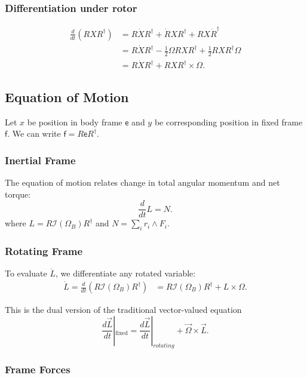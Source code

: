 \subsubsection{Differentiation under rotor}
\begin{align*}
	\frac{d}{dt }(RXR^\dag)
	&= R\dot X R^\dag + \dot R XR^\dag + RX \dot R^\dag \\
	&= R\dot X R^\dag - \frac{1}{2} \Omega R X R^\dag + \frac{1}{2} R X R^\dag \Omega \\
	&= R\dot X R^\dag + RXR^\dag \times \Omega
.\end{align*}



\subsection{Equation of Motion}

Let $x$ be position in body frame $\mathsf{e}$ and $y$ be corresponding position in fixed frame $\mathsf{f}$. We can write $\mathsf{f} = R \mathsf{e} R^{\dag} $.

\subsubsection{Inertial Frame}

The equation of motion relates change in total angular momentum and net torque:
\[
	\frac{d}{dt } L = N
.\] 
where $L = R \mathcal{I}(\Omega_B) R^{\dag} $ and $N = \sum_i r_i \wedge F_i$.

\subsubsection{Rotating Frame}

To evaluate $\dot{L}$, we differentiate any rotated variable:
\begin{align}
	\label{9}
	\dot{L} = \frac{d}{dt }(R\mathcal{I}(\Omega_B)R^\dag)
	&= R \mathcal{I}(\Omega_B) R^{\dag} + L \times \Omega
.\end{align}

\begin{remark}
	This is the dual version of the traditional vector-valued equation
	\[
		\frac{d\vec{L} }{dt}|_{\text{fixed}}
		= \frac{d\vec{L} }{dt}|_{rotating} + \vec{\Omega} \times \vec{L} 
	.\] 
\end{remark}

\subsubsection{Frame Forces}

